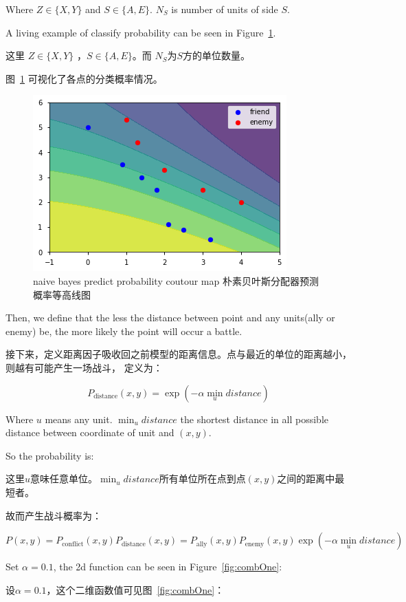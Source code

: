 \documentclass{article}
\begin{document}
Where $Z \in \{ X,Y \}$ and $S \in \{ A,E \}$. $N_S$ is number of units of side $S$.

A living example of classify probability can be seen in Figure~\ref{fig:naivebayes}.

这里 $Z \in \{ X,Y \}$ ，$S \in \{ A,E \}$。而 $N_S$为$S$方的单位数量。

图~\ref{fig:naivebayes} 可视化了各点的分类概率情况。

\begin{figure}[ht]
\includegraphics[width=0.6\linewidth]{naivebayes.png}
\caption{naive bayes predict probability coutour map 朴素贝叶斯分配器预测概率等高线图}
\label{fig:naivebayes}
\end{figure}

Then, we define that the less the distance between point and any units(ally or enemy) be,
the more likely the point will occur a battle.

接下来，定义距离因子吸收回之前模型的距离信息。点与最近的单位的距离越小，则越有可能产生一场战斗，
定义为：

$$
P_{\text{distance}}(x,y) = \exp(-\alpha \min_{u} distance)
$$

Where $u$ means any unit. $\min_u distance$ the shortest distance in all possible distance 
between coordinate of unit and $(x,y)$.

So the probability is:

这里$u$意味任意单位。$\min_u distance$所有单位所在点到点$(x,y)$之间的距离中最短者。

故而产生战斗概率为：

$$
P(x,y) = P_{\text{conflict}}(x,y) P_{\text{distance}}(x,y) = 
P_\text{ally}(x,y) P_\text{enemy}(x,y) \exp(-\alpha \min_{u} distance)
$$

Set $\alpha=0.1$, the 2d function can be seen in Figure~\ref{fig:combOne}:

设$\alpha=0.1$，这个二维函数值可见图~\ref{fig:combOne}：
\end{document}
